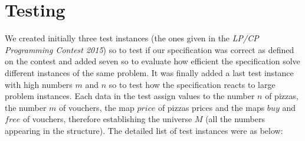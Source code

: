 \documentclass[conference]{IEEEtran}
\begin{document}
\section{Testing}
We created initially three test instances (the ones given in the \textit{LP/CP Programming Contest 2015}) so to test if our specification was correct as defined on the contest and added seven so to evaluate how efficient the specification solve different instances of the same problem. It was finally added a last test instance with high numbers $m$ and $n$ so to test how the specification reacts to large problem instances. Each data in the test assign values to the number $n$ of pizzas, the number $m$ of vouchers, the map $price$ of pizzas prices and the maps $buy$ and $free$ of vouchers, therefore establishing the universe $M$ (all the numbers appearing in the structure). The detailed list of test instances were as below:
\end{document}
